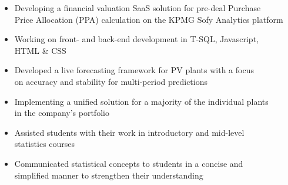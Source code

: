 \documentclass[9pt,a4paper,ragged2e]{altacv}
\begin{document}
    \medskip


    \begin{itemize}
        \item Developing a financial valuation SaaS solution for pre-deal Purchase \\ Price Allocation (PPA) calculation on the KPMG Sofy Analytics platform
        \item Working on front- and back-end development in T-SQL, Javascript, \\ HTML \& CSS
    \end{itemize}

    \divider

    \begin{itemize}
        \item Developed a live forecasting framework for PV plants with a focus \\ on accuracy and stability for multi-period predictions
        \item Implementing a unified solution for a majority of the individual plants \\ in the company's portfolio
    \end{itemize}

    \divider

    \begin{itemize}
        \item Assisted students with their work in introductory and mid-level \\ statistics courses
        \item Communicated statistical concepts to students in a concise and \\ simplified manner to strengthen their understanding
    \end{itemize}

    \divider
\end{document}
